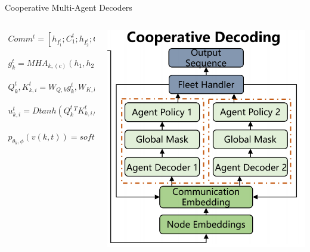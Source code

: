 \documentclass{beamer}
\begin{document}
\begin{frame}{Cooperative Multi-Agent Decoders}
	\begin{columns}
		\begin{column}{0.6\textwidth}
			\footnotesize
			\begin{align}
				Comm^t=[h_{I_1^t};C_1^t;h_{I_2^t};C_2^t;...;h_{I_K^t};C_K^t]
			\end{align}

			\begin{align}
				g_{k}^{t}=MHA_{k,(c)}(h_{1},h_{2},...,h_{2N}),
			\end{align}

			\begin{align}
				Q_{k}^{t},K_{k,i}^{t}=W_{Q,k}g_{k}^{t},W_{K,k}h_{i},
			\end{align}

			\begin{align}
				u_{k,i}^{t}=Dtanh(Q_{k}^{t}{}^{T}K_{k,i}^{t}/\sqrt{d_{k}}),
			\end{align}

			\begin{align}
				p_{\theta_{k},\phi}(v(k,t))=softmax(Mask^{t}(u_{k,i}^{t})),
			\end{align}
		\end{column}
		\begin{column}{0.4\textwidth}
			\centering
			\includegraphics[width=\textwidth]{CD.png} %
		\end{column}
	\end{columns}
\end{frame}
\end{document}
